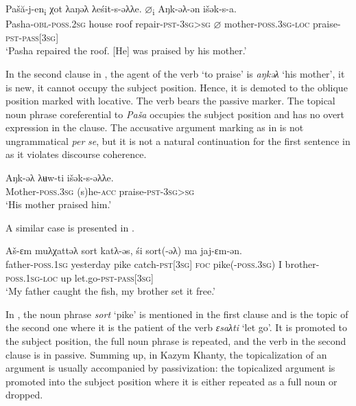 \documentclass[output=paper]{langscibook}
\begin{document}
\ea 
\label{ex:Volkova:72}
 \gll Pašă-j-en\textsubscript{i}  χot λaŋəλ λeśit-s-əλλe. ${\varnothing}$\textsubscript{i} Aŋk-əλ-ən išək-s-a.\\
 Pasha\textsc{{}-obl-poss.2sg} house roof repair\textsc{{}-pst-3sg>sg} ${\varnothing}$ mother\textsc{{}-poss.3sg-loc} praise\textsc{{}-pst-pass[3sg]}\\
 \glt ‘Pasha repaired the roof. [He] was praised by his mother.’
\z
 


In the second clause in , the agent of the verb ‘to praise’ is \textit{aŋkəλ} ‘his mother’, it is new, it cannot occupy the subject position. Hence, it is demoted to the oblique position marked with locative. The verb bears the passive marker. The topical noun phrase coreferential to \textit{Paša} occupies the subject position and has no overt expression in the clause. The accusative argument marking as in  is not ungrammatical \textit{per} \textit{se}, but it is not a natural continuation for the first sentence in  as it violates discourse coherence.

\ea 
\label{ex:Volkova:73}
 \gll Aŋk-əλ  λʉw-ti išək-s-əλλe.\\
 Mother\textsc{{}-poss.3sg} (s)he\textsc{{}-acc} praise\textsc{{}-pst-3sg>sg}\\
 \glt ‘His mother praised him.’
\z
 

A similar case is presented in .

\ea 
\label{ex:Volkova:74}
 \gll Aš-ɛm muλχattəλ sort katλ-əs, śi sort(-əλ) ma jaj-ɛm-ən. \\
 father\textsc{{}-poss.1sg} yesterday pike catch\textsc{{}-pst[3sg]} \textsc{foc} pike(-\textsc{poss.3sg}) I brother\textsc{{}-poss.1sg-loc} up let.go\textsc{{}-pst-pass[3sg]}\\
 \glt ‘My father caught the fish, my brother set it free.’
\z


In , the noun phrase \textit{sort} ‘pike’ is mentioned in the first clause and is the topic of the second one where it is the patient of the verb \textit{ɛsaλti} ‘let go’. It is promoted to the subject position, the full noun phrase is repeated, and the verb in the second clause is in passive. Summing up, in Kazym Khanty, the topicalization of an argument is usually %
accompanied by passivization: the topicalized argument is promoted into the subject position where it is either repeated as a full noun or dropped.
\end{document}
